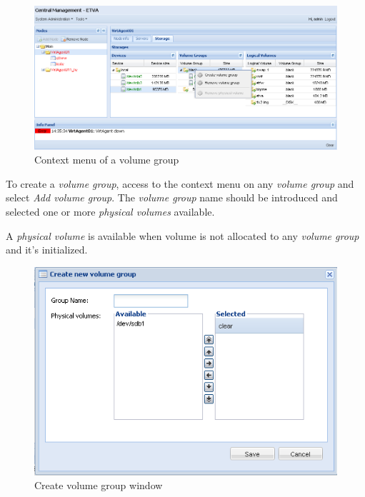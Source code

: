 \begin{figure}[H]
        \begin{center}
        \includegraphics[scale=0.45]{screenshots/node_storage_vg_ctx.png}
        \caption{Context menu of a volume group}
        \label{fig:storage_vg_ctx}
        \end{center}
\end{figure}

To create a \emph{volume group}, access to the context menu on any \emph{volume group} and select \emph{Add volume group}.
The \emph{volume group} name should be introduced and selected one or more \emph{physical volumes} available.

A \emph{physical volume} is available when volume is not allocated to any \emph{volume group} and it's initialized.

\begin{figure}[H]
        \begin{center}
        \includegraphics[scale=0.5]{screenshots/storage_vg_create.png}
        \caption{Create volume group window}
        \label{fig:storage_vg_create}
        \end{center}
\end{figure}

